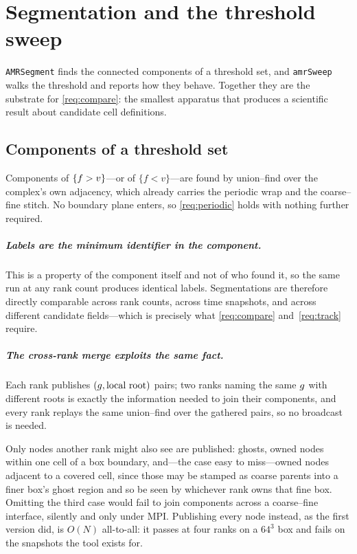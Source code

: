 \chapter{Segmentation and the threshold sweep}
\label{ch:segment}

\texttt{AMRSegment} finds the connected components of a threshold set, and
\texttt{amrSweep} walks the threshold and reports how they behave. Together they
are the substrate for \ref{req:compare}: the smallest apparatus that produces a
scientific result about candidate cell definitions.

\section{Components of a threshold set}

Components of $\{f > v\}$---or of $\{f < v\}$---are found by union--find over
the complex's own adjacency, which already carries the periodic wrap and the
coarse--fine stitch. No boundary plane enters, so \ref{req:periodic} holds with
nothing further required.

\paragraph{Labels are the minimum identifier in the component.}
This is a property of the component itself and not of who found it, so the same
run at any rank count produces identical labels. Segmentations are therefore
directly comparable across rank counts, across time snapshots, and across
different candidate fields---which is precisely what \ref{req:compare}
and~\ref{req:track} require.

\paragraph{The cross-rank merge exploits the same fact.}
Each rank publishes $(g, \text{local root})$ pairs; two ranks naming the same
$g$ with different roots is exactly the information needed to join their
components, and every rank replays the same union--find over the gathered pairs,
so no broadcast is needed.

Only nodes another rank might also see are published: ghosts, owned nodes within
one cell of a box boundary, and---the case easy to miss---owned nodes adjacent to
a covered cell, since those may be stamped as coarse parents into a finer box's
ghost region and so be seen by whichever rank owns that fine box. Omitting the
third case would fail to join components across a coarse--fine interface,
silently and only under MPI. Publishing every node instead, as the first version
did, is $O(N)$ all-to-all: it passes at four ranks on a $64^3$ box and fails on
the snapshots the tool exists for.

